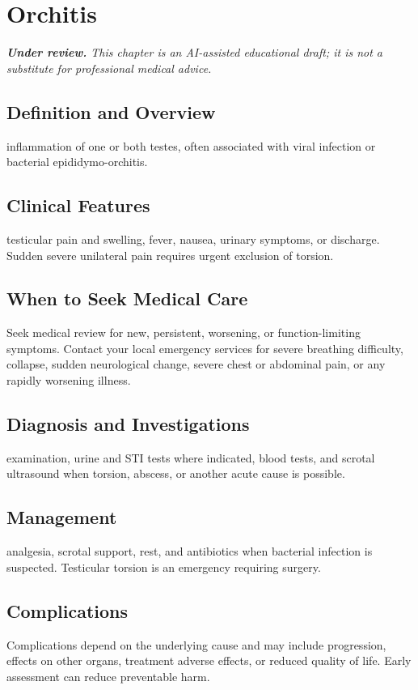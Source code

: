 \chapter{Orchitis}

\medskip
\noindent\textit{\textbf{Under review.} This chapter is an AI-assisted educational draft; it is not a substitute for professional medical advice.}

\section*{Definition and Overview}
inflammation of one or both testes, often associated with viral infection or bacterial epididymo-orchitis.

\section*{Clinical Features}
testicular pain and swelling, fever, nausea, urinary symptoms, or discharge. Sudden severe unilateral pain requires urgent exclusion of torsion.

\section*{When to Seek Medical Care}
Seek medical review for new, persistent, worsening, or function-limiting symptoms. Contact your local emergency services for severe breathing difficulty, collapse, sudden neurological change, severe chest or abdominal pain, or any rapidly worsening illness.

\section*{Diagnosis and Investigations}
examination, urine and STI tests where indicated, blood tests, and scrotal ultrasound when torsion, abscess, or another acute cause is possible.

\section*{Management}
analgesia, scrotal support, rest, and antibiotics when bacterial infection is suspected. Testicular torsion is an emergency requiring surgery.

\section*{Complications}
Complications depend on the underlying cause and may include progression, effects on other organs, treatment adverse effects, or reduced quality of life. Early assessment can reduce preventable harm.

